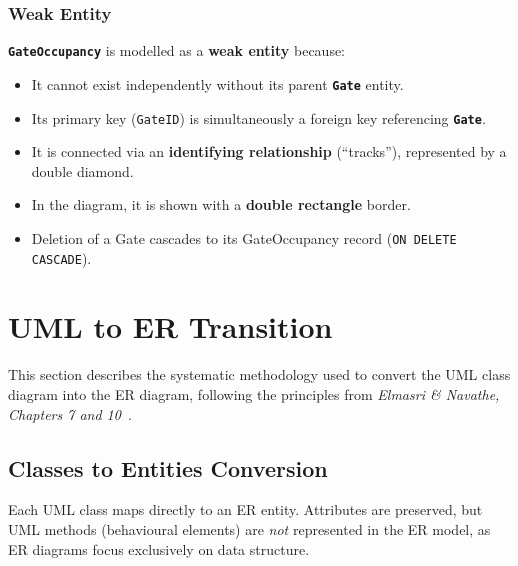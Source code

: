 \documentclass[a4paper, 12pt]{article}
\newcommand{\entityname}[1]{\texttt{\textbf{#1}}}
\begin{document}
\subsubsection{Weak Entity}

\entityname{GateOccupancy} is modelled as a \textbf{weak entity} because:
\begin{itemize}[leftmargin=*, nosep]
    \item It cannot exist independently without its parent \entityname{Gate} entity.
    \item Its primary key (\texttt{GateID}) is simultaneously a foreign key referencing \entityname{Gate}.
    \item It is connected via an \textbf{identifying relationship} (``tracks''), represented by a double diamond.
    \item In the diagram, it is shown with a \textbf{double rectangle} border.
    \item Deletion of a Gate cascades to its GateOccupancy record (\texttt{ON DELETE CASCADE}).
\end{itemize}

\newpage
\section{UML to ER Transition}
\label{sec:transition}

This section describes the systematic methodology used to convert the UML class diagram into the ER diagram, following the principles from \textit{Elmasri \& Navathe, Chapters 7 and 10}~\cite{elmasri2015}.

\subsection{Classes to Entities Conversion}

Each UML class maps directly to an ER entity. Attributes are preserved, but UML methods (behavioural elements) are \textit{not} represented in the ER model, as ER diagrams focus exclusively on data structure.
\end{document}
